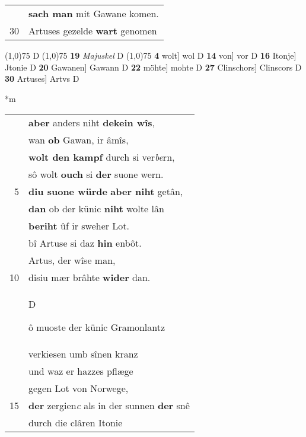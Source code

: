 \documentclass[8pt,a4paper,notitlepage]{article}
\begin{document}
\begin{table}[ht]
\begin{minipage}[t]{0.5\linewidth}
\begin{tabular}{rl}
 & \textbf{sach man} mit Gawane komen.\\ 
30 & Artuses gezelde \textbf{wart} genomen\\ 
\end{tabular}
\scriptsize
\line(1,0){75} \newline
D \newline
\line(1,0){75} \newline
\textbf{19} \textit{Majuskel} D  \newline
\line(1,0){75} \newline
\textbf{4} wolt] wol D \textbf{14} von] vor D \textbf{16} Itonje] Jtonie D \textbf{20} Gawanen] Gawann D \textbf{22} möhte] mohte D \textbf{27} Clinschors] Clinscors D \textbf{30} Artuses] Artvs D \newline
\end{minipage}
\hspace{0.5cm}
\begin{minipage}[t]{0.5\linewidth}
\small
\begin{center}*m
\end{center}
\begin{tabular}{rl}
 & \textbf{aber} anders niht \textbf{dekein wîs},\\ 
 & wan \textbf{ob} Gawan, ir âmîs,\\ 
 & \textbf{wolt den kampf} durch si ver\textit{be}rn,\\ 
 & sô wolt \textbf{ouch} si \textbf{der} suone wern.\\ 
5 & \textbf{diu suone würde} \textbf{aber niht} getân,\\ 
 & \textbf{dan} ob der künic \textbf{niht} wolte lân\\ 
 & \textbf{beriht} ûf ir sweher Lot.\\ 
 & bî Artuse si daz \textbf{hin} enbôt.\\ 
 & Artus, der wîse man,\\ 
10 & disiu mær brâhte \textbf{wider} dan.\\ 
 & \begin{large}D\end{large}ô muoste der künic Gramonlantz\\ 
 & verkiesen umb sînen kranz\\ 
 & und waz er hazzes pflæge\\ 
 & gegen Lot von Norwege,\\ 
15 & \textbf{der} zergien\textit{c} als in der sunnen \textbf{der} snê\\ 
 & durch die clâren Itonie\\ 

\end{tabular}
\end{minipage}
\end{table}
\end{document}
